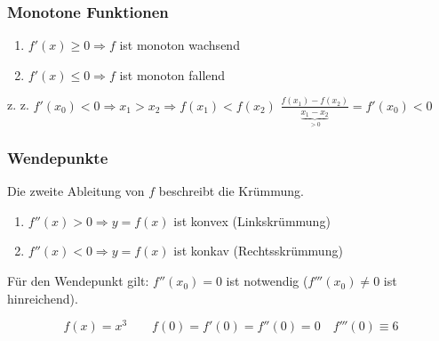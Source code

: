 \subsubsection{Monotone Funktionen}
\begin{enumerate}
	\item $f'(x) \geq 0 \Rightarrow f$ ist monoton wachsend
	\item $f'(x) \leq 0 \Rightarrow f$ ist monoton fallend
\end{enumerate}
\begin{example}
	z. z. $f'(x_0) < 0 \Rightarrow x_1 > x_2 \Rightarrow f(x_1) < f(x_2)$
	$\frac{f(x_1) - f(x_2)}{\underbrace{x_1 - x_2}_{> 0}} = f'(x_0) < 0$
\end{example}

\subsubsection{Wendepunkte}
\begin{note}
	Die zweite Ableitung von $f$ beschreibt die Krümmung.
\end{note}
\begin{enumerate}
	\item $f''(x) > 0 \Rightarrow y = f(x)$ ist konvex (Linkskrümmung)
	\item $f''(x) < 0 \Rightarrow y = f(x)$ ist konkav (Rechtsskrümmung)
\end{enumerate}
Für den Wendepunkt gilt: $f''(x_0) = 0$ ist notwendig ($f'''(x_0) \neq 0$ ist hinreichend).
\begin{example}
	\begin{equation*}
		f(x) = x^3 \qquad f(0) = f'(0) = f''(0) = 0 \quad f'''(0) \equiv 6
	\end{equation*}
\end{example}
